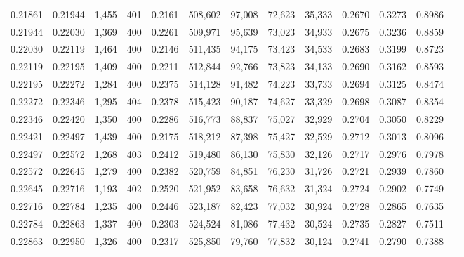 \begin{tabular}{rrrrrrrrrrrrr}
0.21861 & 0.21944 & 1,455 & 401 &                                     0.2161 & 508,602 &  97,008 &  72,623 &  35,333 & 0.2670 & 0.3273 & 0.8986 \\
0.21944 & 0.22030 & 1,369 & 400 &                                     0.2261 & 509,971 &  95,639 &  73,023 &  34,933 & 0.2675 & 0.3236 & 0.8859 \\
0.22030 & 0.22119 & 1,464 & 400 &                                     0.2146 & 511,435 &  94,175 &  73,423 &  34,533 & 0.2683 & 0.3199 & 0.8723 \\
0.22119 & 0.22195 & 1,409 & 400 &                                     0.2211 & 512,844 &  92,766 &  73,823 &  34,133 & 0.2690 & 0.3162 & 0.8593 \\
0.22195 & 0.22272 & 1,284 & 400 &                                     0.2375 & 514,128 &  91,482 &  74,223 &  33,733 & 0.2694 & 0.3125 & 0.8474 \\
0.22272 & 0.22346 & 1,295 & 404 &                                     0.2378 & 515,423 &  90,187 &  74,627 &  33,329 & 0.2698 & 0.3087 & 0.8354 \\
0.22346 & 0.22420 & 1,350 & 400 &                                     0.2286 & 516,773 &  88,837 &  75,027 &  32,929 & 0.2704 & 0.3050 & 0.8229 \\
0.22421 & 0.22497 & 1,439 & 400 &                                     0.2175 & 518,212 &  87,398 &  75,427 &  32,529 & 0.2712 & 0.3013 & 0.8096 \\
0.22497 & 0.22572 & 1,268 & 403 &                                     0.2412 & 519,480 &  86,130 &  75,830 &  32,126 & 0.2717 & 0.2976 & 0.7978 \\
0.22572 & 0.22645 & 1,279 & 400 &                                     0.2382 & 520,759 &  84,851 &  76,230 &  31,726 & 0.2721 & 0.2939 & 0.7860 \\
0.22645 & 0.22716 & 1,193 & 402 &                                     0.2520 & 521,952 &  83,658 &  76,632 &  31,324 & 0.2724 & 0.2902 & 0.7749 \\
0.22716 & 0.22784 & 1,235 & 400 &                                     0.2446 & 523,187 &  82,423 &  77,032 &  30,924 & 0.2728 & 0.2865 & 0.7635 \\
0.22784 & 0.22863 & 1,337 & 400 &                                     0.2303 & 524,524 &  81,086 &  77,432 &  30,524 & 0.2735 & 0.2827 & 0.7511 \\
0.22863 & 0.22950 & 1,326 & 400 &                                     0.2317 & 525,850 &  79,760 &  77,832 &  30,124 & 0.2741 & 0.2790 & 0.7388 \\

\end{tabular}

